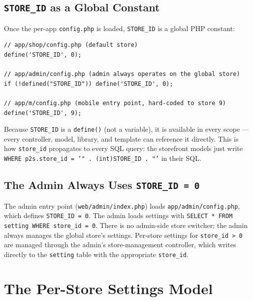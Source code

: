 \documentclass[11pt,a4paper]{article}
\begin{document}
\subsection{\texttt{STORE\_ID} as a Global Constant}

Once the per-app \texttt{config.php} is loaded, \texttt{STORE\_ID} is a
global PHP constant:

\begin{lstlisting}[caption={\texttt{STORE\_ID} definition in per-app config files.},label={lst:store-id}]
// app/shop/config.php (default store)
define('STORE_ID', 0);

// app/admin/config.php (admin always operates on the global store)
if (!defined("STORE_ID")) define('STORE_ID', 0);

// app/m/config.php (mobile entry point, hard-coded to store 9)
define('STORE_ID', 9);
\end{lstlisting}

Because \texttt{STORE\_ID} is a \texttt{define()} (not a variable), it is
available in every scope --- every controller, model, library, and
template can reference it directly. This is how \texttt{store\_id}
propagates to every SQL query: the storefront models just write
\texttt{WHERE p2s.store\_id = '" . (int)STORE\_ID . "'} in their SQL.

\subsection{The Admin Always Uses \texttt{STORE\_ID = 0}}

\begin{findingbox}
The admin entry point (\texttt{web/admin/index.php}) loads
\texttt{app/admin/config.php}, which defines \texttt{STORE\_ID = 0}.
The admin loads settings with
\texttt{SELECT * FROM setting WHERE store\_id = 0}. There is no
admin-side store switcher; the admin always manages the global store's
settings. Per-store settings for \texttt{store\_id > 0} are managed
through the admin's store-management controller, which writes directly
to the \texttt{setting} table with the appropriate \texttt{store\_id}.
\end{findingbox}

\section{The Per-Store Settings Model}\label{sec:settings}
\end{document}
